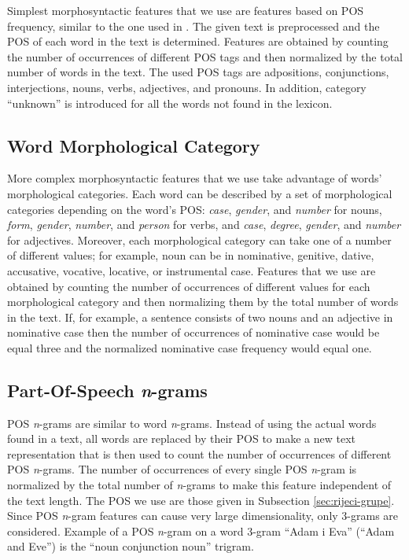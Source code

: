 \documentclass{llncs}
\begin{document}
Simplest morphosyntactic features that we use are features based on POS frequency, similar to the one used in \cite{kukushkina2001using}. The given text is
preprocessed and the POS of each word in the text is determined. Features are
obtained by counting the number of occurrences of different POS tags and then
normalized by the total number of words in the text. The used POS tags are
adpositions, conjunctions, interjections, nouns, verbs,
adjectives, and pronouns. In addition, category ``unknown'' is introduced for all
the words not found in the lexicon.


\subsection{Word Morphological Category}
\label{sec:morphosyntactic}

More complex morphosyntactic features that we use take advantage of words' morphological categories. Each word can be described by a set of morphological
categories depending on the word's POS: \emph{case}, \emph{gender}, and \emph{number}
for nouns, \emph{form}, \emph{gender}, \emph{number}, and \emph{person} for verbs, and
\emph{case}, \emph{degree}, \emph{gender}, and \emph{number} for adjectives.
Moreover, each morphological category can take one of a number of different
values; for example, noun can be in nominative, genitive, dative, accusative, vocative, locative, or instrumental case. Features that we use are obtained by counting the number of occurrences of different values for each morphological category and then normalizing them by the total number of words in the text. If, for example, a sentence consists of two nouns and an adjective in nominative case then the number of occurrences of nominative case would be equal three and the normalized nominative case frequency would equal one.

\subsection{Part-Of-Speech \emph{n}-grams}
\label{sec:ngrami-tipova}
POS \emph{n}-grams are similar to word \emph{n}-grams. Instead of using the actual words found in a text, all words are replaced by their POS to make a new text representation that is then used to count the number of occurrences of different POS \emph{n}-grams. The number of occurrences of every single POS \emph{n}-gram is normalized by the total number of \emph{n}-grams to make this feature independent of the text length. The POS we use are those given in Subsection \ref{sec:rijeci-grupe}.
Since POS \emph{n}-gram features can cause very large dimensionality, only
3-grams are considered. Example of a POS \emph{n}-gram on a word 3-gram ``Adam i
Eva'' (``Adam and Eve'') is the ``noun conjunction noun'' trigram.
\end{document}
